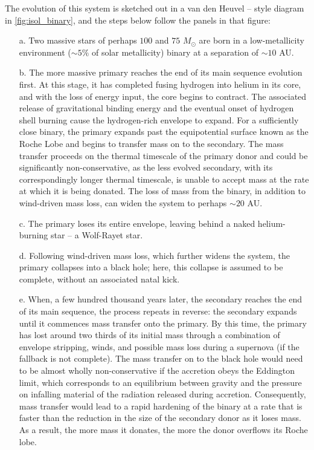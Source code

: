 \documentclass[iop,onecolumn]{revtex4}
\begin{document}
The evolution of this system is sketched out in a van den Heuvel -- style diagram in \autoref{fig:isol_binary}, and the steps below follow the panels in that figure:
\begin{enumerate}  
\item[a.] Two massive stars of perhaps $100$ and $75$ $M_{\odot}$ are born in a low-metallicity environment ($\sim 5\%$ of solar metallicity)  binary at a separation of $\sim 10$ AU.  
\item[b.] The more massive primary reaches the end of its main sequence evolution first.  At this stage, it has completed fusing hydrogen into helium in its core, and with the loss of energy input, the core begins to contract.  The associated release of gravitational binding energy and the eventual onset of hydrogen shell burning cause the hydrogen-rich envelope to expand.  For a sufficiently close binary, the primary expands past the equipotential surface known as the Roche Lobe and begins to transfer mass on to the secondary.  The mass transfer proceeds on the thermal timescale of the primary donor and could be significantly non-conservative, as the less evolved secondary, with its correspondingly longer thermal timescale, is unable to accept mass at the rate at which it is being donated.  The loss of mass from the binary, in addition to wind-driven mass loss, can widen the system to perhaps $\sim 20$ AU.  
\item[c.] The primary loses its entire envelope, leaving behind a naked helium-burning star -- a Wolf-Rayet star.  
\item[d.] Following wind-driven mass loss, which further widens the system, the primary collapses into a black hole; here, this collapse is assumed to be complete, without an associated natal kick.  
\item[e.] When, a few hundred thousand years later, the secondary reaches the end of its main sequence, the process repeats in reverse: the secondary expands until it commences mass transfer onto the primary.  By this time, the primary has lost around two thirds of its initial mass through a combination of envelope stripping, winds, and possible mass loss during a supernova (if the fallback is not complete).  The mass transfer on to the black hole would need to be almost wholly non-conservative if the accretion obeys the Eddington limit, which corresponds to an equilibrium between gravity and the pressure on infalling material of the radiation released during accretion.  Consequently, mass transfer would lead to a rapid hardening of the binary at a rate that is faster than the reduction in the size of the secondary donor as it loses mass.  As a result, the more mass it donates, the more the donor overflows its Roche lobe.  

\end{enumerate}
\end{document}
